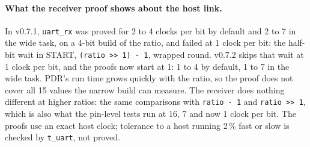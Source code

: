 \documentclass[11pt,a4paper]{article}
\newcommand{\sig}[1]{\texttt{#1}}
\begin{document}
\paragraph{What the receiver proof shows about the host link.} In v0.7.1, \sig{uart\_rx} was proved for 2 to 4 clocks per bit by default and 2 to 7 in the wide task, on a 4-bit build of the ratio, and failed at 1 clock per bit: the half-bit wait in START, \sig{(ratio >> 1) - 1}, wrapped round. v0.7.2 skips that wait at 1 clock per bit, and the proofs now start at 1: 1 to 4 by default, 1 to 7 in the wide task. PDR's run time grows quickly with the ratio, so the proof does not cover all 15 values the narrow build can measure. The receiver does nothing different at higher ratios: the same comparisons with \sig{ratio - 1} and \sig{ratio >> 1}, which is also what the pin-level tests run at 16, 7 and now 1 clock per bit. The proofs use an exact host clock; tolerance to a host running 2\,\% fast or slow is checked by \sig{t\_uart}, not proved.
\end{document}
